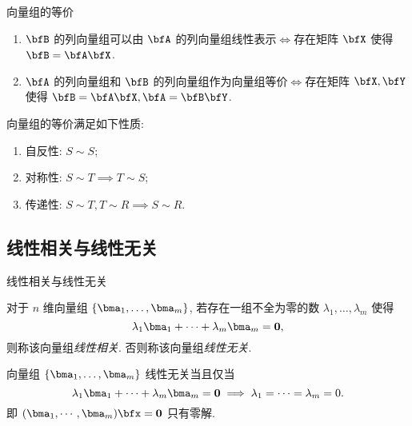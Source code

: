 \begin{frame}{向量组的等价}
	\onslide<+->
	\begin{theorem}
		\begin{enumerate}
			\item $\bfB$ 的列向量组可以由 $\bfA$ 的列向量组线性表示$\iff$存在矩阵 $\bfX$ 使得 $\bfB=\bfA\bfX$.
			\item $\bfA$ 的列向量组和 $\bfB$ 的列向量组作为向量组等价$\iff$存在矩阵 $\bfX,\bfY$ 使得 $\bfB=\bfA\bfX,\bfA=\bfB\bfY$.
		\end{enumerate}
	\end{theorem}
	\onslide<+->
	\begin{proposition}
		向量组的等价满足如下性质:
		\begin{enumerate}
			\item 自反性: $S\sim S$;
			\item 对称性: $S\sim T\implies T\sim S$;
			\item 传递性: $S\sim T,T\sim R\implies S\sim R$.
		\end{enumerate}
	\end{proposition}
\end{frame}


\subsection{线性相关与线性无关}

\begin{frame}{线性相关与线性无关}
	\onslide<+->
	\begin{definition}
		对于 $n$ 维向量组 $\{\bma_1,\dots,\bma_m\}$,
		若存在一组\alert{不全为零}的数 $\lambda_1,\dots,\lambda_m$ 使得
		\[\lambda_1\bma_1+\dots+\lambda_m\bma_m={\bf0},\]
		则称该向量组\emph{线性相关}.
		否则称该向量组\emph{线性无关}.
	\end{definition}
	\onslide<+->
	向量组 $\{\bma_1,\dots,\bma_m\}$ 线性无关当且仅当
	\[\lambda_1\bma_1+\dots+\lambda_m\bma_m={\bf0}\implies
	\lambda_1=\cdots=\lambda_m=0.\]
	\onslide<+->
	即 $(\bma_1,\cdots,\bma_m)\bfx={\bf0}$ 只有零解.
\end{frame}


